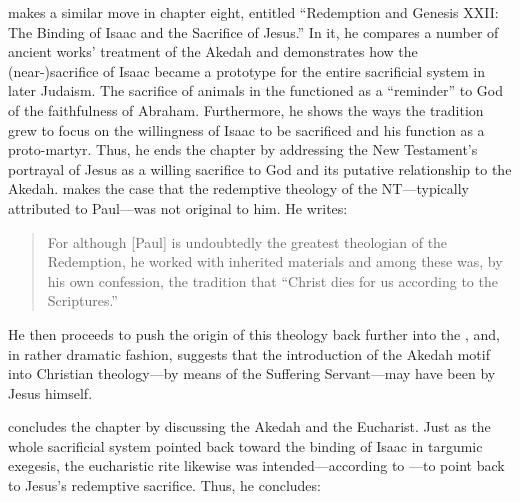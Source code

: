 \vermes makes a similar move in chapter eight, entitled ``Redemption and Genesis XXII: The Binding of Isaac and the Sacrifice of Jesus.'' In it, he compares a number of ancient works' treatment of the Akedah and demonstrates how the (near-)sacrifice of Isaac became a prototype for the entire sacrificial system in later Judaism. The sacrifice of animals in the \temple functioned as a ``reminder'' to God of the faithfulness of Abraham. Furthermore, he shows the ways the tradition grew to focus on the willingness of Isaac to be sacrificed and his function as a proto-martyr. Thus, he ends the chapter by addressing the New Testament's portrayal of Jesus as a willing sacrifice to God and its putative relationship to the Akedah. \vermes makes the case that the redemptive theology of the NT---typically attributed to Paul---was not original to him. He writes: 

\begin{quote}
    For although [Paul] is undoubtedly the greatest theologian of the Redemption, he worked with inherited materials and among these was, by his own confession, the tradition that ``Christ dies for us according to the Scriptures.''%
    \autocite[221]{vermes1961}
\end{quote}
\noindent
He then proceeds to push the origin of this theology back further into the , and, in rather dramatic fashion, suggests that the introduction of the Akedah motif into Christian theology---by means of the Suffering Servant---may have been by Jesus himself.%
    \autocite[223]{vermes1961}

\vermes concludes the chapter by discussing the Akedah and the Eucharist. Just as the whole sacrificial system pointed back toward the binding of Isaac in targumic exegesis, the eucharistic rite likewise was intended---according to \vermes---to point back to Jesus's redemptive sacrifice. Thus, he concludes: 

